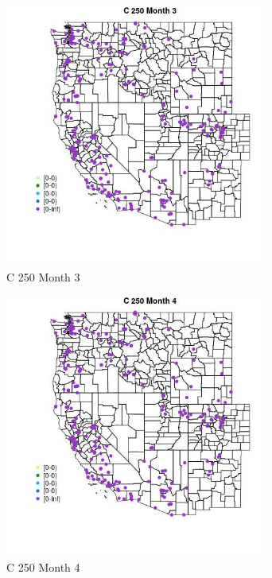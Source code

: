 \begin{figure} 
\centering  
\includegraphics[width=0.77\textwidth]{Code_Outputs/Report_ML_input_PM25_Step4_part_e_de_duplicated_aveswNAs_MapObsMo3C_250.jpg} 
\caption{\label{fig:Report_ML_input_PM25_Step4_part_e_de_duplicated_aveswNAsMapObsMo3C_250}C 250 Month 3} 
\end{figure} 
 

\begin{figure} 
\centering  
\includegraphics[width=0.77\textwidth]{Code_Outputs/Report_ML_input_PM25_Step4_part_e_de_duplicated_aveswNAs_MapObsMo4C_250.jpg} 
\caption{\label{fig:Report_ML_input_PM25_Step4_part_e_de_duplicated_aveswNAsMapObsMo4C_250}C 250 Month 4} 
\end{figure} 
 

